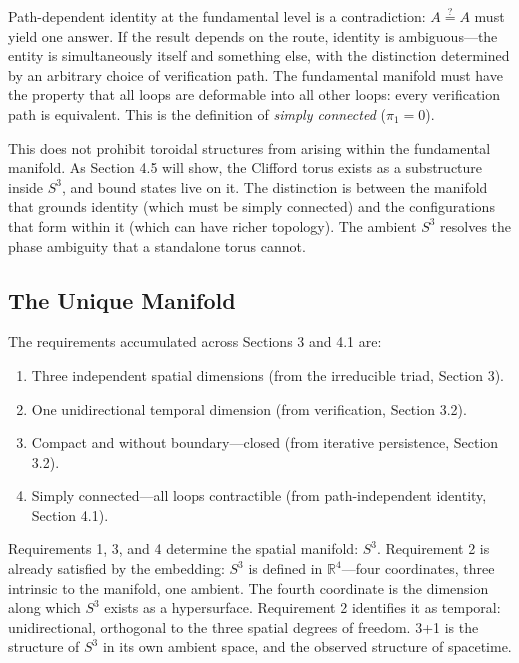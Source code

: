 \documentclass[12pt]{article}
\begin{document}
Path-dependent identity at the fundamental level is a contradiction: 
$A \stackrel{?}{=} A$ must yield one answer. If the result depends on the 
route, identity is ambiguous---the entity is simultaneously itself and 
something else, with the distinction determined by an arbitrary choice of 
verification path. The fundamental manifold must have the property that all 
loops are deformable into all other loops: every verification path is 
equivalent. This is the definition of \textit{simply connected} ($\pi_1 = 0$).

This does not prohibit toroidal structures from arising within the 
fundamental manifold. As Section 4.5 will show, the Clifford torus exists 
as a substructure inside $S^3$, and bound states live on it. The 
distinction is between the manifold that grounds identity (which must be 
simply connected) and the configurations that form within it (which can 
have richer topology). The ambient $S^3$ resolves the phase ambiguity that 
a standalone torus cannot.

\subsection{The Unique Manifold}

The requirements accumulated across Sections 3 and 4.1 are:

\begin{enumerate}
\item Three independent spatial dimensions (from the irreducible triad, Section 3).
\item One unidirectional temporal dimension (from verification, Section 3.2).
\item Compact and without boundary---closed (from iterative persistence, Section 3.2).
\item Simply connected---all loops contractible (from path-independent identity, Section 4.1).
\end{enumerate}

Requirements 1, 3, and 4 determine the spatial manifold: $S^3$. Requirement 2 is already satisfied by the embedding: $S^3$ is defined in $\mathbb{R}^4$---four coordinates, three intrinsic to the manifold, one ambient. The fourth coordinate is the dimension along which $S^3$ exists as a hypersurface. Requirement 2 identifies it as temporal: unidirectional, orthogonal to the three spatial degrees of freedom. 3+1 is the structure of $S^3$ in its own ambient space, and the observed structure of spacetime.
\end{document}

